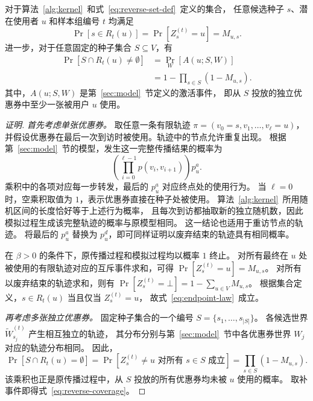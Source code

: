 \begin{theorem}[正向传播与反向覆盖的概率一致性]
\label{thm:probability-equivalence}
对于算法~\ref{alg:kernel}~和式~\eqref{eq:reverse-set-def}~定义的集合，
任意候选种子 $s$、潜在使用者 $u$ 和样本组编号 $t$ 均满足
\begin{equation}
\label{eq:endpoint-law}
 \Pr[s\in R_t(u)]=\Pr[Z_s^{(t)}=u]=M_{u,s}.
\end{equation}
进一步，对于任意固定的种子集合 $S\subseteq V$，有
\begin{equation}
\label{eq:reverse-coverage}
 \begin{aligned}
 \Pr[S\cap R_t(u)\ne\emptyset]
 &=\Pr_W[A(u;S,W)]\\
 &=1-\prod_{s\in S}(1-M_{u,s}).
 \end{aligned}
\end{equation}
其中，$A(u;S,W)$ 是第~\ref{sec:model}~节定义的激活事件，
即从 $S$ 投放的独立优惠券中至少一张被用户 $u$ 使用。
\end{theorem}
\begin{proof}[证明]\renewcommand{\qedsymbol}{}
\emph{首先考虑单张优惠券。}
取任意一条有限轨迹 $\pi=(v_0=s,v_1,\ldots,v_\ell=u)$，
并假设优惠券在最后一次到访时被使用。轨迹中的节点允许重复出现。
根据第~\ref{sec:model}~节的模型，发生这一完整传播结果的概率为
\begin{equation}
\label{eq:trajectory-probability}
 \left(\prod_{i=0}^{\ell-1}p(v_i,v_{i+1})\right)p_u^a.
\end{equation}
乘积中的各项对应每一步转发，最后的 $p_u^a$ 对应终点处的使用行为。
当 $\ell=0$ 时，空乘积取值为 $1$，表示优惠券直接在种子处被使用。
算法~\ref{alg:kernel}~所用随机区间的长度恰好等于上述行为概率，
且每次到访都抽取新的独立随机数，因此模拟过程生成该完整轨迹的概率与原模型相同。
这一结论也适用于重访节点的轨迹。
将最后的 $p_u^a$ 替换为 $p_u^d$，即可同样证明以废弃结束的轨迹具有相同概率。

在 $\beta>0$ 的条件下，原传播过程和模拟过程均以概率 $1$ 终止。
对所有最终在 $u$ 处被使用的有限轨迹对应的互斥事件求和，可得
$\Pr[Z_s^{(t)}=u]=M_{u,s}$。
对所有以废弃结束的轨迹求和，则有
$\Pr[Z_s^{(t)}=\bot]=1-\sum_{u\in V}M_{u,s}$。
根据集合定义，$s\in R_t(u)$ 当且仅当 $Z_s^{(t)}=u$，
故式~\eqref{eq:endpoint-law}~成立。

\emph{再考虑多张独立优惠券。}
固定种子集合的一个编号 $S=\{s_1,\ldots,s_{|S|}\}$。
各候选世界 $\widetilde W_{s_j}^{(t)}$ 产生相互独立的轨迹，
其分布分别与第~\ref{sec:model}~节中各优惠券世界 $W_j$ 对应的轨迹分布相同。
因此，
\[
 \Pr[S\cap R_t(u)=\emptyset]
 =\Pr[Z_s^{(t)}\ne u\text{ 对所有 }s\in S\text{ 成立}]
 =\prod_{s\in S}(1-M_{u,s}).
\]
该乘积也正是原传播过程中，从 $S$ 投放的所有优惠券均未被 $u$ 使用的概率。
取补事件即得式~\eqref{eq:reverse-coverage}。
\end{proof}

